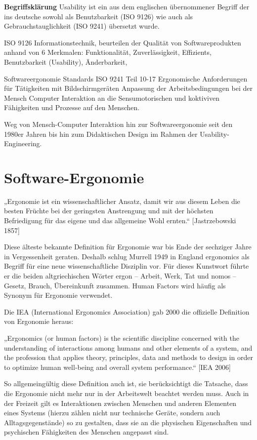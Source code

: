 \documentclass[a4paper, 12pt, twoside, BCOR=20mm, DIV=calc, abstracton, parskip=half*, toc=bibliography, toc=listof, headsepline, footsepline, headings=small, numbers=enddot]{scrreprt}
\begin{document}
\textbf{Begriffsklärung}
Usability ist ein aus dem englischen übernommener Begriff der ins deutsche sowohl als Benutzbarkeit (ISO 9126) wie auch als Gebrauchstauglichkeit (ISO 9241) übersetzt wurde. 

ISO 9126 Informationstechnik, beurteilen der Qualität von Softwareprodukten anhand von 6 Merkmalen: Funktionalität, Zuverlässigkeit, Effizients, Benutzbarkeit (Usability), Änderbarkeit, 

Softwareergonomie Standards ISO 9241 Teil 10-17 Ergonomische Anforderungen für Tätigkeiten mit Bildschirmgeräten
Anpassung der Arbeitsbedingungen bei der Mensch Computer Interaktion an die Sensumotorischen und koktiviven Fähigkeiten und Prozesse auf den Menschen.

Weg von Mensch-Computer Interaktion hin zur Softwareergonomie seit den 1980er Jahren bis hin zum Didaktischen Design im Rahmen der Usability-Engineering. 

\section{Software-Ergonomie}
„Ergonomie ist ein wissenschaftlicher Ansatz, damit wir aus diesem Leben die besten Früchte bei der geringsten Anstrengung und mit der höchsten Befriedigung für das eigene und das allgemeine Wohl ernten.“ [Jastrzebowski 1857]

Diese älteste bekannte Definition für Ergonomie war bis Ende der sechziger Jahre in Vergessenheit geraten. Deshalb schlug Murrell 1949 in England ergonomics als Begriff für eine neue wissenschaftliche Disziplin vor. Für dieses Kunstwort führte er die beiden altgriechischen Wörter ergon – Arbeit, Werk, Tat und nomos – Gesetz, Brauch, Übereinkunft zusammen. Human Factors wird häufig als Synonym für Ergonomie verwendet.

Die IEA (International Ergonomics Association) gab 2000 die offizielle Definition von Ergonomie heraus:

„Ergonomics (or human factors) is the scientific discipline concerned with the understanding of interactions among humans and other elements of a system, and the profession that applies theory, principles, data and methods to design in order to optimize human well-being and overall system performance.“ [IEA 2006]

So allgemeingültig diese Definition auch ist, sie berücksichtigt die Tatsache, dass die Ergonomie nicht mehr nur in der Arbeitswelt beachtet werden muss. Auch in der Freizeit gilt es Interaktionen zwischen Menschen und anderen Elementen eines Systems (hierzu zählen nicht nur technische Geräte, sondern auch Alltagsgegenstände) so zu gestalten, dass sie an die physischen Eigenschaften und psychischen Fähigkeiten des Menschen angepasst sind.
\end{document}

